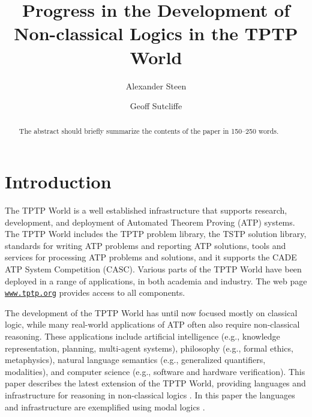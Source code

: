 \documentclass[runningheads]{llncs}
\begin{document}
\title{Progress in the Development of\\ Non-classical Logics in the TPTP World}

\author{Alexander Steen 
\and
Geoff Sutcliffe}

\maketitle
\begin{abstract}
The abstract should briefly summarize the contents of the paper in
150--250 words.

\end{abstract}
\section{Introduction}
\label{Introduction}

The TPTP World \cite{Sut17} is a well established infrastructure that supports research, 
development, and deployment of Automated Theorem Proving (ATP) systems.
The TPTP World includes the TPTP problem library,
the TSTP solution library,
standards for writing ATP problems and reporting ATP solutions,
tools and services for processing ATP problems and solutions,
and it supports the CADE ATP System Competition (CASC).
Various parts of the TPTP World have been deployed in a range of applications,
in both academia and industry.
The web page \href{https://www.tptp.org}{\tt www.tptp.org} provides access to all 
components.

The development of the TPTP World has until now focused mostly on classical logic, while many 
real-world applications of ATP often also require non-classical reasoning. 
These applications include artificial intelligence (e.g., knowledge representation, planning, 
multi-agent systems), philosophy (e.g., formal ethics, metaphysics), natural language semantics 
(e.g., generalized quantifiers, modalities), and computer science (e.g., software and hardware 
verification).
This paper describes the latest extension of the TPTP World, providing languages and
infrastructure for reasoning in non-classical logics \cite{Pri08,Gob01}.
In this paper the languages and infrastructure are exemplified using modal logics \cite{BBW06}.
\end{document}
